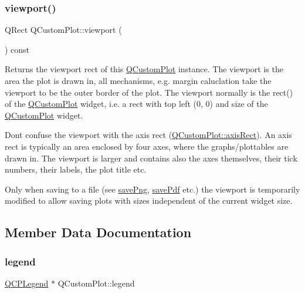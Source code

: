 \subsubsection{\texorpdfstring{viewport()}{viewport()}}
{\footnotesize\ttfamily Q\+Rect Q\+Custom\+Plot\+::viewport (\begin{DoxyParamCaption}{ }\end{DoxyParamCaption}) const\hspace{0.3cm}{\ttfamily [inline]}}

Returns the viewport rect of this \mbox{\hyperlink{class_q_custom_plot}{Q\+Custom\+Plot}} instance. The viewport is the area the plot is drawn in, all mechanisms, e.\+g. margin caluclation take the viewport to be the outer border of the plot. The viewport normally is the rect() of the \mbox{\hyperlink{class_q_custom_plot}{Q\+Custom\+Plot}} widget, i.\+e. a rect with top left (0, 0) and size of the \mbox{\hyperlink{class_q_custom_plot}{Q\+Custom\+Plot}} widget.

Don\textquotesingle{}t confuse the viewport with the axis rect (\mbox{\hyperlink{class_q_custom_plot_ae5eefcb5f6ca26689b1fd4f6e25b42f9}{Q\+Custom\+Plot\+::axis\+Rect}}). An axis rect is typically an area enclosed by four axes, where the graphs/plottables are drawn in. The viewport is larger and contains also the axes themselves, their tick numbers, their labels, the plot title etc.

Only when saving to a file (see \mbox{\hyperlink{class_q_custom_plot_a7636261aff1f6d25c9da749ece3fc8b8}{save\+Png}}, \mbox{\hyperlink{class_q_custom_plot_a632da44c6d94ea8b271eb483b08b5114}{save\+Pdf}} etc.) the viewport is temporarily modified to allow saving plots with sizes independent of the current widget size. 

\subsection{Member Data Documentation}
\mbox{\label{class_q_custom_plot_a4eadcd237dc6a09938b68b16877fa6af}} 
\subsubsection{\texorpdfstring{legend}{legend}}
{\footnotesize\ttfamily \mbox{\hyperlink{class_q_c_p_legend}{Q\+C\+P\+Legend}} $\ast$ Q\+Custom\+Plot\+::legend}

